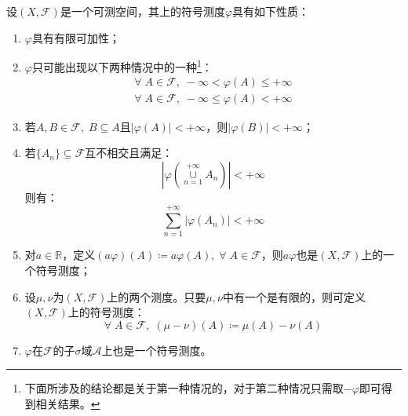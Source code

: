 \begin{property}\label{prop:SignedMeasure}
	设$(X,\mathscr{F})$是一个可测空间，其上的符号测度$\varphi$具有如下性质：
	\begin{enumerate}
		\item $\varphi$具有有限可加性；
		\item $\varphi$只可能出现以下两种情况中的一种\footnote{下面所涉及的结论都是关于第一种情况的，对于第二种情况只需取$-\varphi$即可得到相关结果。}：
		\begin{gather*}
			\forall\;A\in\mathscr{F},\;-\infty<\varphi(A)\leqslant+\infty \\
			\forall\;A\in\mathscr{F},\;-\infty\leqslant\varphi(A)<+\infty
		\end{gather*}
		\item 若$A,B\in\mathscr{F},\;B\subseteq A$且$|\varphi(A)|<+\infty$，则$|\varphi(B)|<+\infty$；
		\item 若$\{A_n\}\subseteq\mathscr{F}$互不相交且满足：
		\begin{equation*}
			\left|\varphi\left(\underset{n=1}{\overset{+\infty}{\cup}}A_n\right)\right|<+\infty
		\end{equation*}
		则有：
		\begin{equation*}
			\sum_{n=1}^{+\infty}|\varphi(A_n)|<+\infty
		\end{equation*}
		\item 对$a\in\mathbb{R}$，定义$(a\varphi)(A)\coloneq a\varphi(A),\;\forall\;A\in\mathscr{F}$，则$a\varphi$也是$(X,\mathscr{F})$上的一个符号测度；
		\item 设$\mu,\nu$为$(X,\mathscr{F})$上的两个测度。只要$\mu,\nu$中有一个是有限的，则可定义$(X,\mathscr{F})$上的符号测度：
		\begin{equation*}
			\forall\;A\in\mathscr{F},\;(\mu-\nu)(A)\coloneq\mu(A)-\nu(A)
		\end{equation*}
		\item $\varphi$在$\mathscr{F}$的子$\sigma$域$\mathscr{A}$上也是一个符号测度。
	\end{enumerate}
\end{property}
